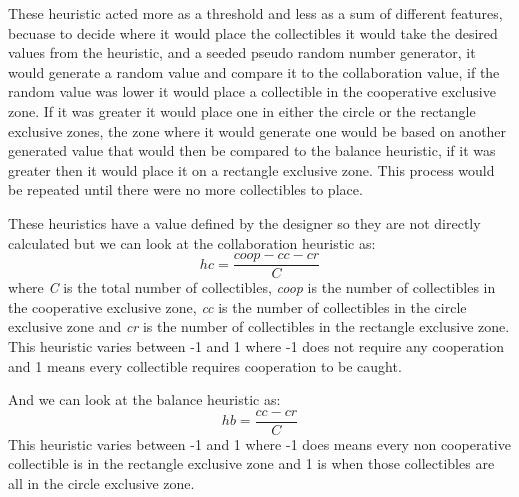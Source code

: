\documentclass[runningheads]{llncs}
\begin{document}
These heuristic acted more as a threshold and less as a sum of different features, becuase to decide where it would place the collectibles it would take the desired values from the heuristic, and a seeded pseudo random number generator, it would generate a random value and compare it to the collaboration value, if the random value was lower it would place a collectible in the cooperative exclusive zone. If it was greater it would place one in either the circle or the rectangle exclusive zones, the zone where it would generate one would be based on another generated value that would then be compared to the balance heuristic, if it was greater then it would place it on a rectangle exclusive zone. This process would be repeated until there were no more collectibles to place. 
 
These heuristics have a value defined by the designer so they are not directly calculated but we can look at the collaboration heuristic as:
\begin{equation}
hc = \frac{coop - cc - cr}{ C} 
\end{equation}
where \textit{C} is the total number of collectibles, \textit{coop} is the number of collectibles in the cooperative exclusive zone, \textit{cc} is the number of collectibles in the circle exclusive zone and \textit{cr} is the number of collectibles in the rectangle exclusive zone. This heuristic varies between -1 and 1 where -1 does not require any cooperation and 1 means every collectible requires cooperation to be caught. 

And we can look at the balance heuristic as:
\begin{equation}
hb = \frac{cc - cr}{ C} 
\end{equation}
This heuristic varies between -1 and 1 where -1 does means every non cooperative collectible is in the rectangle exclusive zone and 1 is when those collectibles are all in the circle exclusive zone.
\end{document}
